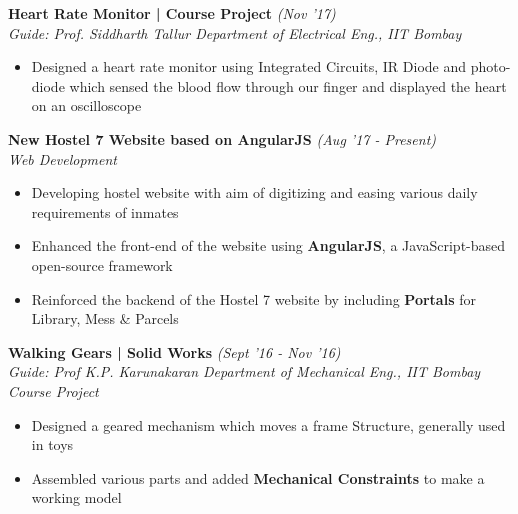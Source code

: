 \documentclass[11pt]{article}%
\begin{document}
\vspace{-0.3cm}

\pagebreak
{\flushleft \bf \large{Heart Rate Monitor | Course Project}} \hfill  \hfill {{\em{(Nov '17)} }}\\
{\em{Guide: Prof. Siddharth Tallur \textbar Department of Electrical Eng., IIT Bombay}}
\begin{itemize}
\vspace{-2mm}
\setlength\itemsep{0.01em}
\item Designed a heart rate monitor using Integrated Circuits, IR Diode and photo-diode which sensed the blood flow through our finger and displayed the heart on an oscilloscope
\vspace{-1mm}
\end{itemize}




{\flushleft \bf \large{New Hostel 7 Website based on AngularJS}} \hfill {{{\em {(Aug '17 - Present)}}}}\\
{\em{Web Development}}
\begin{itemize}
\vspace{-0.3cm}
\setlength\itemsep{0.01em}
\item Developing hostel website with aim of digitizing and easing various daily requirements of inmates
\item \nohyphens{Enhanced the front-end of the website using \textbf{AngularJS}, a JavaScript-based open-source framework}
\item Reinforced the backend of the Hostel 7 website by including \textbf{Portals} for Library, Mess \& Parcels
\end{itemize}
\vspace{-2mm}


\vspace{-3mm}



{\flushleft \bf \large{Walking Gears | Solid Works}} \hfill {{{\em{(Sept '16 - Nov '16)}}}} \\
{\em{Guide: Prof K.P. Karunakaran \textbar Department of Mechanical Eng., IIT Bombay \hfill {{\em {Course Project}}}}}
\vspace{-1mm}
\begin{itemize}
\setlength\itemsep{0.01em}
\item Designed a geared mechanism which moves a frame Structure, generally used in toys
\item Assembled various parts and added \textbf{Mechanical Constraints} to make a working model
\end{itemize}
\end{document}
